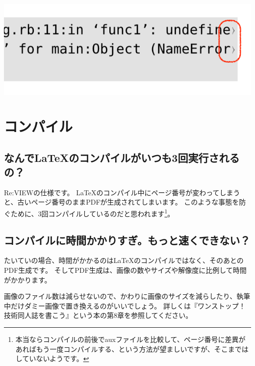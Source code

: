 \begin{reviewimage}%
\includegraphics[width=0.7\maxwidth]{./images/chap02-faq/codeblock_rpadding2.png}%
\label{image:chap02-faq:codeblock_rpadding2}
\end{reviewimage}

\section{コンパイル}
\label{sec:2-5}

\subsection*{なんで\LaTeX{}のコンパイルがいつも3回実行されるの？}
\label{sec:2-5-1}

Re:VIEWの仕様です。
\LaTeX{}のコンパイル中にページ番号が変わってしまうと、古いページ番号のままPDFが生成されてしまいます。
このような事態を防ぐために、3回コンパイルしているのだと思われます\footnote{本当ならコンパイルの前後でauxファイルを比較して、ページ番号に差異があればもう一度コンパイルする、という方法が望ましいですが、そこまではしていないようです。}。

\subsection*{コンパイルに時間かかりすぎ。もっと速くできない？}
\label{sec:2-5-2}

たいていの場合、時間がかかるのは\LaTeX{}のコンパイルではなく、そのあとのPDF生成です。
そしてPDF生成は、画像の数やサイズや解像度に比例して時間がかかります。

画像のファイル数は減らせないので、かわりに画像のサイズを減らしたり、執筆中だけダミー画像で置き換えるのがいいでしょう。
詳しくは『ワンストップ！技術同人誌を書こう』という本の第8章を参照してください。

